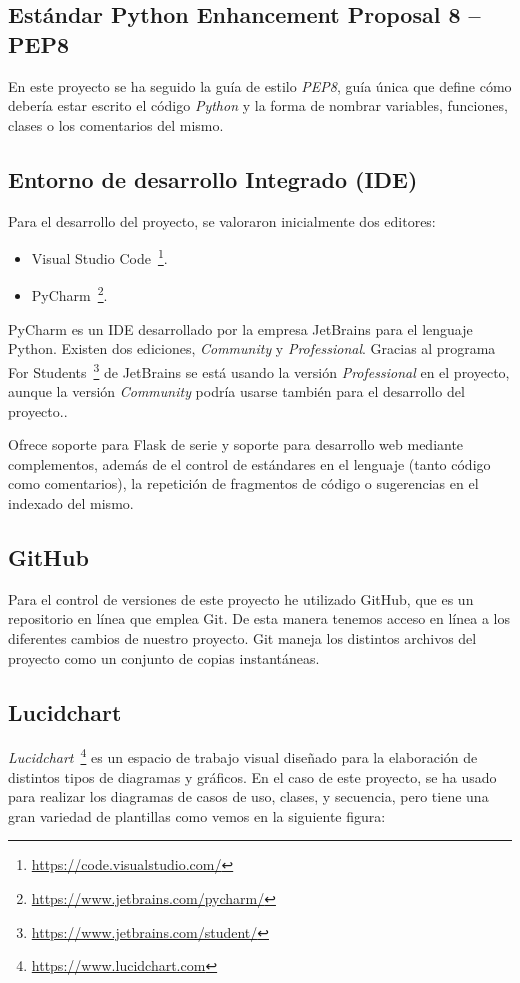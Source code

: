 \subsection{Estándar Python Enhancement Proposal 8 -- PEP8}
En este proyecto se ha seguido la guía de estilo \textit{PEP8}, guía única que define cómo debería estar escrito el código \textit{Python} y la forma de nombrar variables, funciones, clases o los comentarios del mismo.


\subsection{Entorno de desarrollo Integrado (IDE)}
Para el desarrollo del proyecto, se valoraron inicialmente dos editores:
\begin{itemize}	
	\item Visual Studio Code~\footnote{\url{https://code.visualstudio.com/}}.
	\item PyCharm~\footnote{\url{https://www.jetbrains.com/pycharm/}}.
\end{itemize}

PyCharm es un IDE desarrollado por la empresa JetBrains para el lenguaje Python. Existen dos ediciones, \textit{Community} y \textit{Professional}. Gracias al programa For Students~\footnote{\url{https://www.jetbrains.com/student/}} de JetBrains se está usando la versión \textit{Professional} en el proyecto, aunque la versión \textit{Community} podría usarse también para el desarrollo del proyecto..

Ofrece soporte para Flask de serie y soporte para desarrollo web mediante complementos, además de el control de estándares en el lenguaje (tanto código como comentarios), la repetición de fragmentos de código o sugerencias en el indexado del mismo.



\subsection{GitHub}
Para el control de versiones de este proyecto he utilizado GitHub, que es un repositorio en línea que emplea Git. De esta manera tenemos acceso en línea a los diferentes cambios de nuestro proyecto.
Git maneja los distintos archivos del proyecto como un conjunto de copias instantáneas.

\subsection{Lucidchart}
\textit{Lucidchart}~\footnote{\url{https://www.lucidchart.com}} es un espacio de trabajo visual diseñado para la elaboración de distintos tipos de diagramas y gráficos. En el caso de este proyecto, se ha usado para realizar los diagramas de casos de uso, clases, y secuencia, pero tiene una gran variedad de plantillas como vemos en la siguiente figura:

